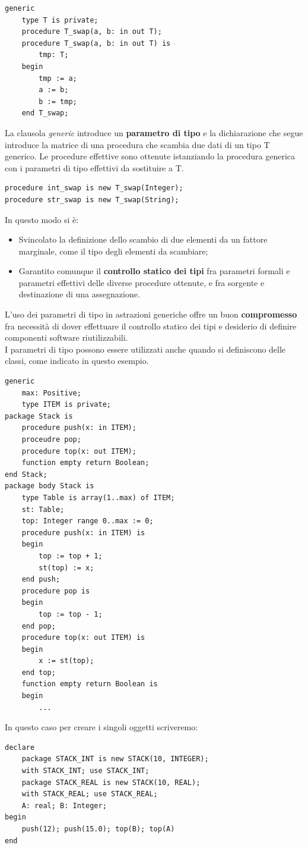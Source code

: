 \documentclass[12pt]{report}
\begin{document}
\begin{lstlisting}[style=adastyle]
generic
	type T is private;
	procedure T_swap(a, b: in out T);
	procedure T_swap(a, b: in out T) is
		tmp: T;
	begin
		tmp := a;
		a := b;
		b := tmp;
	end T_swap;\end{lstlisting}
La clausola \textit{generic} introduce un \textbf{parametro di tipo} e la dichiarazione che segue introduce la matrice di una procedura che scambia due dati di un tipo T generico. Le procedure effettive sono ottenute istanziando la procedura generica con i parametri di tipo effettivi da sostituire a T.
\begin{lstlisting}[style=adastyle]
procedure int_swap is new T_swap(Integer);
procedure str_swap is new T_swap(String);\end{lstlisting}
In questo modo si è:
\begin{itemize}
	\item Svincolato la definizione dello scambio di due elementi da un fattore marginale, come il tipo degli elementi da scambiare;
	\item Garantito comunque il \textbf{controllo statico dei tipi} fra parametri formali e parametri effettivi delle diverse procedure ottenute, e fra sorgente e destinazione di una assegnazione.
\end{itemize}
L'uso dei parametri di tipo in astrazioni generiche offre un buon \textbf{compromesso} fra necessità di dover effettuare il controllo statico dei tipi e desiderio di definire componenti software riutilizzabili. \\
I parametri di tipo possono essere utilizzati anche quando si definiscono delle classi, come indicato in questo esempio.
\begin{lstlisting}[style=adastyle]
generic
	max: Positive;
	type ITEM is private;
package Stack is
	procedure push(x: in ITEM);
	proceudre pop;
	procedure top(x: out ITEM);
	function empty return Boolean;
end Stack;
package body Stack is
	type Table is array(1..max) of ITEM;
	st: Table;
	top: Integer range 0..max := 0;
	procedure push(x: in ITEM) is
	begin
		top := top + 1;
		st(top) := x;
	end push;
	procedure pop is
	begin
		top := top - 1;
	end pop;
	procedure top(x: out ITEM) is
	begin
		x := st(top);
	end top;
	function empty return Boolean is
	begin
		...\end{lstlisting}
In questo caso per creare i singoli oggetti scriveremo:
\begin{lstlisting}[style=adastyle]
declare
	package STACK_INT is new STACK(10, INTEGER);
	with STACK_INT; use STACK_INT;
	package STACK_REAL is new STACK(10, REAL);
	with STACK_REAL; use STACK_REAL;
	A: real; B: Integer;
begin
	push(12); push(15.0); top(B); top(A)
end\end{lstlisting}
\end{document}
